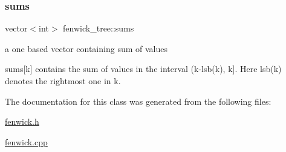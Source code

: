 \subsubsection{\texorpdfstring{sums}{sums}}
{\footnotesize\ttfamily vector$<$int$>$ fenwick\+\_\+tree\+::sums\hspace{0.3cm}{\ttfamily [private]}}



a one based vector containing sum of values 

sums\mbox{[}k\mbox{]} contains the sum of values in the interval (k-\/lsb(k), k\mbox{]}. Here lsb(k) denotes the rightmost one in k. 

The documentation for this class was generated from the following files\+:\begin{DoxyCompactItemize}
\item 
\hyperlink{fenwick_8h}{fenwick.\+h}\item 
\hyperlink{fenwick_8cpp}{fenwick.\+cpp}\end{DoxyCompactItemize}
